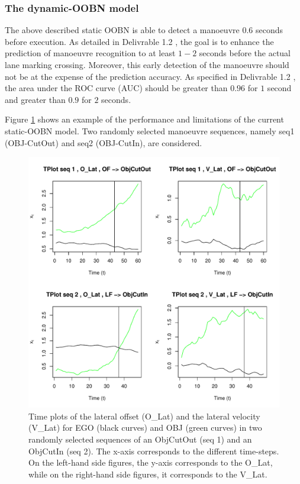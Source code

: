 \subsubsection*{The dynamic-OOBN model}\label{Section:DaimlerDynamic}

The above described static OOBN is able to detect a manoeuvre $0.6$ seconds before execution. As detailed in Delivrable 1.2 \cite{Fer14b}, the goal is to enhance the prediction of manoeuvre recognition to at least $1-2$ seconds before the actual lane marking crossing. Moreover, this early detection of the manoeuvre should not be at the expense of the prediction accuracy. As specified in Delivrable 1.2 \cite{Fer14b}, the area under the ROC curve (AUC) should be greater than $0.96$ for $1$ second and greater than $0.9$ for $2$ seconds.

Figure \ref{Figure:daimlerTPlot} shows an example of the performance and limitations of the current static-OOBN model. Two randomly selected manoeuvre sequences, namely seq1 (OBJ-CutOut) and seq2 (OBJ-CutIn), are considered.

\begin{figure}[ht!]
\begin{center}
\includegraphics[scale=0.65]{./figures/DaimlerLE_EGO_L_LE_OBJ_R_OBJCut.pdf}
\caption{\label{Figure:daimlerTPlot}Time plots of the lateral offset (O\_Lat) and the lateral velocity (V\_Lat) for EGO (black curves) and OBJ (green curves) in two randomly selected sequences of an ObjCutOut (seq 1) and an ObjCutIn (seq 2). The x-axis corresponds to the different time-steps. On the left-hand side figures, the y-axis corresponds to the O\_Lat, while on the right-hand side figures, it corresponds to the V\_Lat.}
\end{center}
\end{figure}

